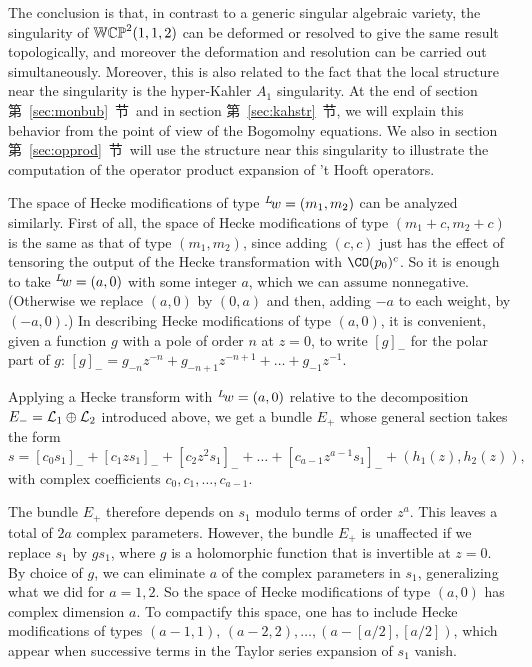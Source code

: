 The conclusion is that, in contrast to a generic singular
algebraic variety, the singularity of $\Bbb{WCP}^2(1,1,2)$ can be
deformed or resolved to give the same result topologically, and
moreover the deformation and resolution can be carried out
simultaneously. Moreover, this is also related to the fact that
the local structure near the singularity is the hyper-Kahler $A_1$
singularity.  At the end of section 第~\ref{sec:monbub}~节\ and in section
第~\ref{sec:kahstr}~节, we will explain this behavior from the point of view of
the Bogomolny equations.
 We also in section 第~\ref{sec:opprod}~节\
will use the structure near this singularity to illustrate the
computation of the operator product expansion of 't Hooft
operators.

\par{}

The space of Hecke modifications of type $^L\negthinspace
w=(m_1,m_2)$ can be analyzed similarly.  First of all, the space
of Hecke modifications of type $(m_1+c,m_2+c)$ is the same as that
of type $(m_1,m_2)$, since adding $(c,c)$ just has the effect of
tensoring the output of the Hecke transformation with
${\CO}(p_0)^c$.  So it is enough to take $^L\negthinspace w=(a,0)$
with some integer $a$, which  we can assume nonnegative.
(Otherwise we replace $(a,0)$ by $(0,a)$ and then, adding $-a$ to
each weight, by $(-a,0)$.) In describing Hecke modifications of
type $(a,0)$, it is convenient, given a function $g$ with a pole
of order $n$ at $z=0$, to write $[g]_-$ for the polar part of $g$:
$[g]_-=g_{-n}z^{-n}+g_{-n+1}z^{-n+1}+\dots + g_{-1}z^{-1}$.

Applying a Hecke transform with $^L\negthinspace w=(a,0)$ relative
to the decomposition $E_-={\cal L}_1\oplus {\cal L}_2$ introduced
above, we get a bundle $E_+$ whose general section takes the form
\setcounter{equation}{22}
\begin{equation}\label{eq:indon}
s=[c_0s_1]_-+[c_1zs_1]_-+[c_2z^2s_1]_-+\dots
+[c_{a-1}z^{a-1}s_1]_-+(h_1(z),h_2(z)),
\end{equation}
 with complex coefficients
$c_0,c_1,\dots,c_{a-1}$.

The bundle $E_+$ therefore depends on $s_1$ modulo terms of order
$z^a$. This leaves a total of $2a$ complex parameters. However,
the bundle $E_+$ is unaffected if we replace $s_1$ by $gs_1$,
where $g$ is a holomorphic function that is invertible at $z=0$.
By choice of $g$, we can eliminate $a$ of the complex parameters
in $s_1$, generalizing what we did for $a=1,2$. So the space of
Hecke modifications of type $(a,0)$ has complex dimension $a$. To
compactify this space, one has to include Hecke modifications of
types $(a-1,1), \,(a-2,2),\dots, (a-[a/2],[a/2])$, which appear
when successive terms in the Taylor series expansion of $s_1$
vanish.

